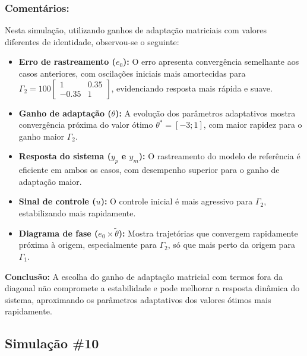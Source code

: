 \documentclass[10pt]{article}
\begin{document}
\subsubsection{Comentários:}

Nesta simulação, utilizando ganhos de adaptação matriciais com valores diferentes de identidade, observou-se o seguinte:

\begin{itemize}
    \item \textbf{Erro de rastreamento ($e_0$):} O erro apresenta convergência semelhante aos casos anteriores, com oscilações iniciais mais amortecidas para $\Gamma_2 = 100 \begin{bmatrix} 1 & 0.35 \\ -0.35 & 1 \end{bmatrix}$, evidenciando resposta mais rápida e suave.

    \item \textbf{Ganho de adaptação ($\theta$):} A evolução dos parâmetros adaptativos mostra convergência próxima do valor ótimo $\theta^* = [-3;1]$, com maior rapidez para o ganho maior $\Gamma_2$.

    \item \textbf{Resposta do sistema ($y_p$ e $y_m$):} O rastreamento do modelo de referência é eficiente em ambos os casos, com desempenho superior para o ganho de adaptação maior.

    \item \textbf{Sinal de controle ($u$):} O controle inicial é mais agressivo para $\Gamma_2$, estabilizando mais rapidamente.

    \item \textbf{Diagrama de fase ($e_0 \times \tilde{\theta}$):} Mostra trajetórias que convergem rapidamente próxima à origem, especialmente para $\Gamma_2$, só que mais perto da origem para $\Gamma_1$.
\end{itemize}

\textbf{Conclusão:} A escolha do ganho de adaptação matricial com termos fora da diagonal não compromete a estabilidade e pode melhorar a resposta dinâmica do sistema, aproximando os parâmetros adaptativos dos valores ótimos mais rapidamente.

\newpage

\subsection{Simulação \#10}
\end{document}
